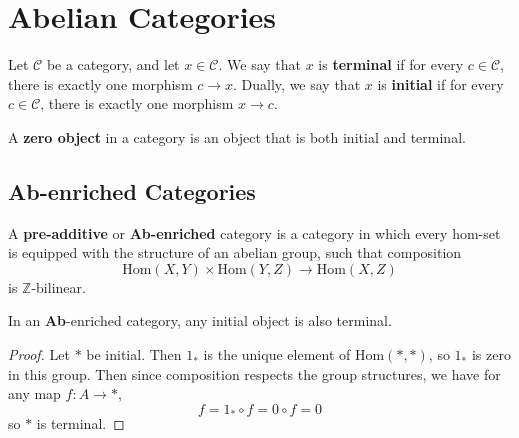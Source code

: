 \section{Abelian Categories} %
\label{sec:abelian_categories}
\begin{definition}
  Let $ \mathcal{C} $ be a category, and let $ x \in \mathcal{C} $. We say that $ x $ is \textbf{terminal} if for every $ c \in \mathcal{C} $, there is exactly one morphism $ c \to x $. Dually, we say that $ x $ is \textbf{initial} if for every $ c \in \mathcal{C} $, there is exactly one morphism $ x \to c $.
\end{definition}

\begin{definition}
   A \textbf{zero object} in a category is an object that is both initial and terminal.
\end{definition}

\subsection{Ab-enriched Categories} %
\label{sub:ab_enriched_categories}
\begin{definition}
   A \textbf{pre-additive} or \textbf{Ab-enriched} category is a category in which every hom-set is equipped with the structure of an abelian group, such that composition
   \begin{equation*}
     \text{Hom}(X,Y) \times \text{Hom}(Y, Z) \to \text{Hom}(X,Z)
   \end{equation*}
   is $ \mathbb{Z} $-bilinear.
\end{definition}

\begin{proposition}
   In an \textbf{Ab}-enriched category, any initial object is also terminal.
\end{proposition}
\begin{proof}
  Let $ * $ be initial. Then $ 1_{*} $ is the unique element of $ \text{Hom}(*, *) $, so $ 1_* $ is zero in this group. Then since composition respects the group structures, we have for any map $ f: A \to * $,
  \begin{equation*}
  f = 1_* \circ f = 0 \circ f = 0
  \end{equation*}
  so $ * $ is terminal.
\end{proof}

